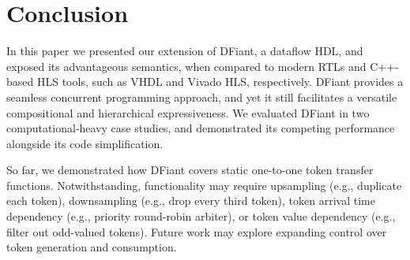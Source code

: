 \section{Conclusion}
\label{sec:conclusion}
In this paper we presented our extension of DFiant, a dataflow HDL, and exposed its advantageous semantics, when compared to modern RTLs and C++-based HLS tools, such as VHDL and Vivado HLS, respectively. DFiant provides a seamless concurrent programming approach, and yet it still facilitates a versatile compositional and hierarchical expressiveness. We evaluated DFiant in two computational-heavy case studies, and demonstrated its competing performance alongside its code simplification. 

So far,  we demonstrated how DFiant covers static one-to-one token transfer functions. Notwithstanding, functionality may require upsampling (e.g., duplicate each token), downsampling (e.g., drop every third token), token arrival time dependency (e.g., priority round-robin arbiter), or token value dependency (e.g., filter out odd-valued tokens). Future work may explore expanding control over token generation and consumption.
